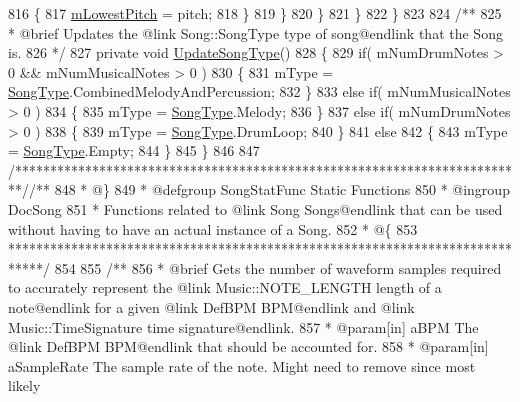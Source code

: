 \begin{DoxyCodeInclude}
816                     \{
817                         \hyperlink{group___song_priv_var_ga293976ef4c2050687a81edfbf77b4fc1}{mLowestPitch} = pitch;
818                     \}
819                 \}
820             \}
821         \}
822     \}
823 \textcolor{comment}{}
824 \textcolor{comment}{    /**}
825 \textcolor{comment}{     * @brief Updates the @link Song::SongType type of song@endlink that the Song is.}
826 \textcolor{comment}{    */}
827     \textcolor{keyword}{private} \textcolor{keywordtype}{void} \hyperlink{group___song_priv_func_ga9a1d6eba1576c3631d3c0331196d9ae2}{UpdateSongType}()
828     \{
829         \textcolor{keywordflow}{if}( mNumDrumNotes > 0 && mNumMusicalNotes > 0 )
830         \{
831             mType = \hyperlink{group___song_enums_gae681a1f001333e39fc1cb4fea97bfe1b}{SongType}.CombinedMelodyAndPercussion;
832         \}
833         \textcolor{keywordflow}{else} \textcolor{keywordflow}{if}( mNumMusicalNotes > 0 )
834         \{
835             mType = \hyperlink{group___song_enums_gae681a1f001333e39fc1cb4fea97bfe1b}{SongType}.Melody;
836         \}
837         \textcolor{keywordflow}{else} \textcolor{keywordflow}{if}( mNumDrumNotes > 0 )
838         \{
839             mType = \hyperlink{group___song_enums_gae681a1f001333e39fc1cb4fea97bfe1b}{SongType}.DrumLoop;
840         \}
841         \textcolor{keywordflow}{else}
842         \{
843             mType = \hyperlink{group___song_enums_gae681a1f001333e39fc1cb4fea97bfe1b}{SongType}.Empty;
844         \}
845     \}
846 
847     \textcolor{comment}{/*************************************************************************/}\textcolor{comment}{/** }
848 \textcolor{comment}{     * @\}}
849 \textcolor{comment}{     * @defgroup SongStatFunc Static Functions}
850 \textcolor{comment}{     * @ingroup DocSong}
851 \textcolor{comment}{     * Functions related to @link Song Songs@endlink that can be used without having to have an actual
       instance of a Song.}
852 \textcolor{comment}{     * @\{}
853 \textcolor{comment}{    *****************************************************************************/}
854 \textcolor{comment}{}
855 \textcolor{comment}{    /** }
856 \textcolor{comment}{     * @brief Gets the number of waveform samples required to accurately represent the @link
       Music::NOTE\_LENGTH length of a note@endlink for a given @link DefBPM BPM@endlink and @link Music::TimeSignature time
       signature@endlink.}
857 \textcolor{comment}{     * @param[in] aBPM The @link DefBPM BPM@endlink that should be accounted for.}
858 \textcolor{comment}{     * @param[in] aSampleRate The sample rate of the note. Might need to remove since most likely
}
\end{DoxyCodeInclude}
